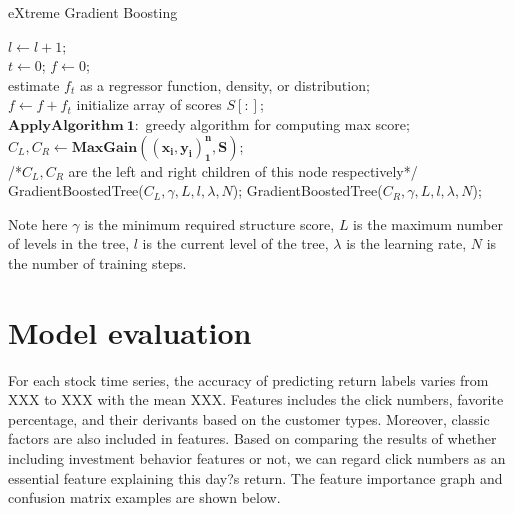 \documentclass[letterpaper]{article}
\begin{document}
\begin{algorithm}[htbp]
            \caption{eXtreme Gradient Boosting}
            $l \gets l + 1$;\\
            { 
            $t \gets 0$; $f \gets 0$;\\
                { 
                    estimate $f_t$ as a regressor function, density, or distribution;\\
                    $f \gets f + f_t$
                }
                initialize array of scores $S[:]$;\\
                $\bm{Apply Algorithm\ 1:}$ greedy algorithm for computing max score;\\
                $C_L, C_R \gets \bm{MaxGain\left((x_i, y_i)_1^n, S\right)}$;\\
                /*$C_L, C_R$ are the left and right children of this node respectively*/\\
                {
                GradientBoostedTree($C_L, \gamma, L, l, \lambda, N$);
                }
                {
                GradientBoostedTree($C_R, \gamma, L, l, \lambda, N$);
                }
            } 
\end{algorithm}

Note here $\gamma$ is the minimum required structure score, $L$ is the maximum number of levels in the tree, $l$ is the current level of the tree, $\lambda$ is the learning rate, $N$ is the number of training steps.

\section{Model evaluation}
\label{model_evaluation}

For each stock time series, the accuracy of predicting return labels varies from XXX to XXX with the mean XXX. Features includes the click numbers, favorite percentage, and their derivants based on the customer types. Moreover, classic factors are also included in features. Based on comparing the results of whether including investment behavior features or not, we can regard click numbers as an essential feature explaining this day?s return. The feature importance graph and confusion matrix examples are shown below.
\end{document}
